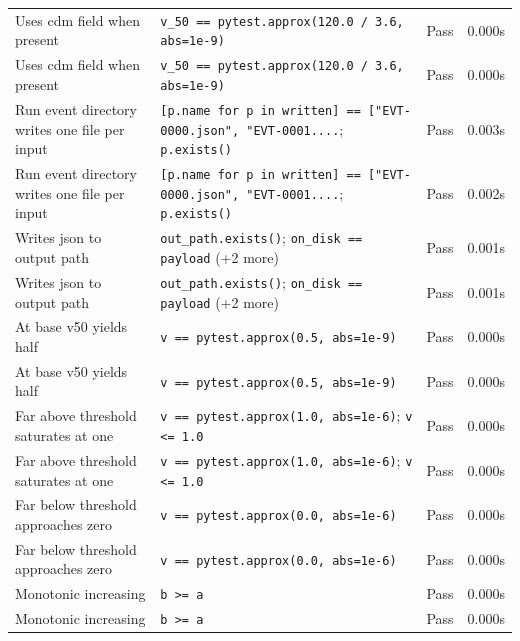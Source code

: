 \documentclass[11pt,a4paper]{article}
\begin{document}
\begin{longtable}{p{6cm}p{5.5cm}cc}
    Uses cdm field when present & {\scriptsize \texttt{v\_50 == pytest.approx(120.0 / 3.6, abs=1e-9)}} & \textcolor{green!60!black}{Pass} & 0.000s \\
    Uses cdm field when present & {\scriptsize \texttt{v\_50 == pytest.approx(120.0 / 3.6, abs=1e-9)}} & \textcolor{green!60!black}{Pass} & 0.000s \\
    Run event directory writes one file per input & {\scriptsize \texttt{[p.name for p in written] == ["EVT-0000.json", "EVT-0001....}; \texttt{p.exists()}} & \textcolor{green!60!black}{Pass} & 0.003s \\
    Run event directory writes one file per input & {\scriptsize \texttt{[p.name for p in written] == ["EVT-0000.json", "EVT-0001....}; \texttt{p.exists()}} & \textcolor{green!60!black}{Pass} & 0.002s \\
    Writes json to output path & {\scriptsize \texttt{out\_path.exists()}; \texttt{on\_disk == payload} (+2 more)} & \textcolor{green!60!black}{Pass} & 0.001s \\
    Writes json to output path & {\scriptsize \texttt{out\_path.exists()}; \texttt{on\_disk == payload} (+2 more)} & \textcolor{green!60!black}{Pass} & 0.001s \\
    At base v50 yields half & {\scriptsize \texttt{v == pytest.approx(0.5, abs=1e-9)}} & \textcolor{green!60!black}{Pass} & 0.000s \\
    At base v50 yields half & {\scriptsize \texttt{v == pytest.approx(0.5, abs=1e-9)}} & \textcolor{green!60!black}{Pass} & 0.000s \\
    Far above threshold saturates at one & {\scriptsize \texttt{v == pytest.approx(1.0, abs=1e-6)}; \texttt{v <= 1.0}} & \textcolor{green!60!black}{Pass} & 0.000s \\
    Far above threshold saturates at one & {\scriptsize \texttt{v == pytest.approx(1.0, abs=1e-6)}; \texttt{v <= 1.0}} & \textcolor{green!60!black}{Pass} & 0.000s \\
    Far below threshold approaches zero & {\scriptsize \texttt{v == pytest.approx(0.0, abs=1e-6)}} & \textcolor{green!60!black}{Pass} & 0.000s \\
    Far below threshold approaches zero & {\scriptsize \texttt{v == pytest.approx(0.0, abs=1e-6)}} & \textcolor{green!60!black}{Pass} & 0.000s \\
    Monotonic increasing & {\scriptsize \texttt{b >= a}} & \textcolor{green!60!black}{Pass} & 0.000s \\
    Monotonic increasing & {\scriptsize \texttt{b >= a}} & \textcolor{green!60!black}{Pass} & 0.000s \\

\end{longtable}
\end{document}
